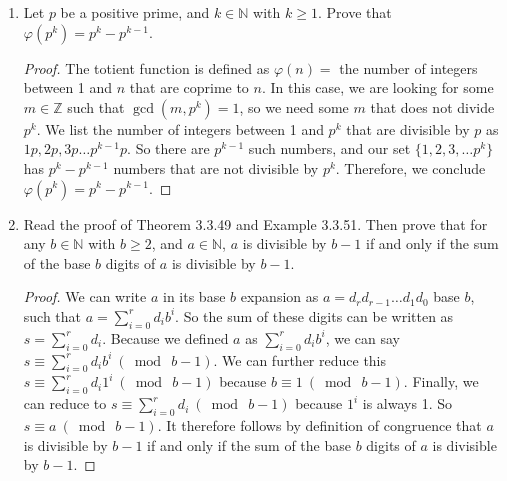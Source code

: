 \documentclass[12pt]{article}
\DeclareMathOperator{\Gcd}{gcd}
\renewcommand{\gcd}[2]{\Gcd\left(#1, #2\right)}
\newcommand{\Z}{\mathbb{Z}}
\newcommand{\N}{\mathbb{N}}
\newcommand{\Mod}[1]{\ (\bmod\ #1)}
\begin{document}
\begin{enumerate}
\begin{proof}
($\Rightarrow$) Assume $u, u'$ are multiplicative inverses for $a$, such that $au \equiv 1 \Mod{n}$ and $au' \equiv 1 \Mod{n}$. Then, since $a$ and $n$ are coprime, we manipulate then divide by $a$ so $a(u - u') \equiv 0 \Mod{n}$ and $u - u' \equiv 0 \Mod{n}$, so $u \equiv u' \Mod{n}$ and we are done. 

($\Leftarrow$) Assume $u$ is a multiplicative inverse for $a$ and $u\equiv u'\Mod{n}$, so we have $au \equiv 1 \Mod{n}$ and $u \equiv u' \Mod{n}$. We can multiply by $a$ to get $au \equiv au' \Mod{n}$. Since we know $au \equiv 1 \Mod{n}$ and $au \equiv au' \Mod{n}$, we can say $au' \equiv 1 \Mod{n}$. This, taken with the fact $au \equiv 1 \Mod{n}$ implies that $u, u'$ are multiplicative inverses for $a$. 

Therefore, since we have shown both sides of implication, it follows that $u, u'$ are both multiplicative inverses for $a$ if and only if $u$ is a multiplicative inverse for $a$ and $u\equiv u'\Mod{n}$.
\end{proof}

\item Let $p$ be a positive prime, and $k\in \N$ with $k\geq 1$. Prove that $\varphi(p^k) = p^k-p^{k-1}$.

\begin{proof}
The totient function is defined as $\varphi(n) = $ the number of integers between 1 and $n$ that are coprime to $n$. In this case, we are looking for some $m \in \Z$ such that $\gcd{m}{p^k} = 1$, so we need some $m$ that does not divide $p^k$. We list the number of integers between 1 and $p^k$ that are divisible by $p$ as $1p, 2p, 3p \dots p^{k-1}p$. So there are $p^{k-1}$ such numbers, and our set $\{1, 2, 3, \dots p^k\}$ has $p^k - p^{k-1}$ numbers that are not divisible by $p^k$. Therefore, we conclude $\varphi(p^k) = p^k-p^{k-1}$.
\end{proof}

\item Read the proof of Theorem 3.3.49 and Example 3.3.51. Then prove that for any $b\in \N$ with $b\geq 2$, and $a\in \N$, $a$ is divisible by $b-1$ if and only if the sum of the base $b$ digits of $a$ is divisible by $b-1$.

\begin{proof}
We can write $a$ in its base $b$ expansion as $a = d_r d_{r-1} \dots d_1 d_0$ base $b$, such that $ a = \sum\limits_{i=0}^r d_ib^i$. So the sum of these digits can be written as $s = \sum\limits_{i=0}^r d_i$. Because we defined $a$ as $\sum\limits_{i=0}^r d_ib^i$, we can say $s \equiv \sum\limits_{i=0}^r d_ib^i \Mod{b-1}$. We can further reduce this $s \equiv \sum\limits_{i=0}^r d_i1^i \Mod{b-1}$ because $b \equiv 1 \Mod{b-1}$. Finally, we can reduce to $s \equiv \sum\limits_{i=0}^r d_i \Mod{b-1}$ because $1^i$ is always 1. So $s \equiv a \Mod{b-1}$. It therefore follows by definition of congruence that $a$ is divisible by $b-1$ if and only if the sum of the base $b$ digits of $a$ is divisible by $b-1$.
\end{proof}


\end{enumerate}
\end{document}
